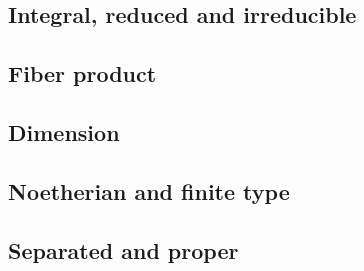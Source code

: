 \subsection{Integral, reduced and irreducible}

\subsection{Fiber product}

\subsection{Dimension}

\subsection{Noetherian and finite type}

\subsection{Separated and proper}
